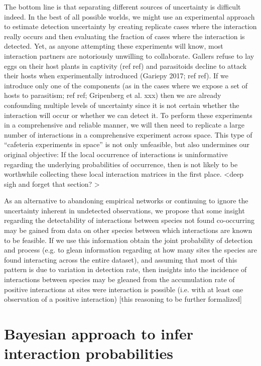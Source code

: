 ﻿\documentclass[12pt]{article}
\begin{document}
  The bottom line is that separating different sources of uncertainty is difficult indeed. In the best of all possible worlds, we might use an experimental approach to estimate detection uncertainty by creating replicate cases where the interaction really occurs and then evaluating the fraction of cases where the interaction is detected. Yet, as anyone attempting these experiments will know, most interaction partners are notoriously unwilling to collaborate. Gallers refuse to lay eggs on their host plants in captivity (ref ref) and parasitoids decline to attack their hosts when experimentally introduced (Gariepy 2017; ref ref). If we introduce only one of the components (as in the cases where we expose a set of hosts to parasitism; ref ref; Gripenberg et al. xxx) then we are already confounding multiple levels of uncertainty since it is not certain whether the interaction will occur or whether we can detect it. To perform these experiments in a comprehensive and reliable manner, we will then need to replicate a large number of interactions in a comprehensive experiment across space. This type of “cafeteria experiments in space” is not only unfeasible, but also undermines our original objective: If the local occurrence of interactions is uninformative regarding the underlying probabilities of occurrence, then is not likely to be worthwhile collecting these local interaction matrices in the first place. <deep sigh and forget that section? > 


  As an alternative to abandoning empirical networks or continuing to ignore the uncertainty inherent in undetected observations, we propose that some insight regarding the detectability of interactions between species not found co-occurring may be gained from data on other species between which interactions are known to be feasible. If we use this information obtain the joint probability of detection and process (e.g. to glean information regarding at how many sites the species are found interacting across the entire dataset), and assuming that most of this pattern is due to variation in detection rate, then insights into the incidence of interactions between species may be gleaned from the accumulation rate of positive interactions at sites were interaction is possible (i.e. with at least one observation of a positive interaction) [this reasoning to be further formalized]


\section*{Bayesian approach to infer interaction probabilities}
\end{document}
